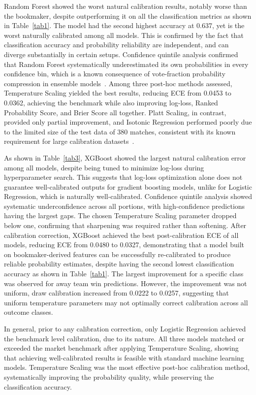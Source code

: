 \documentclass[conference]{IEEEtran}
\begin{document}
Random Forest showed the worst natural calibration results,
notably worse than the bookmaker, despite outperforming it
on all the classification metrics as shown in
Table~\ref{tab1}. The model had the second highest accuracy
at 0.637, yet is the worst naturally calibrated among all
models. This is confirmed by the fact that classification
accuracy and probability reliability are independent, and
can diverge substantially in certain setups. Confidence
quintile analysis confirmed that Random Forest systematically
underestimated its own probabilities in every confidence bin,
which is a known consequence of vote-fraction probability
compression in ensemble models~\cite{b12}. Among three
post-hoc methods assessed, Temperature Scaling yielded the
best results, reducing ECE from 0.0453 to 0.0362, achieving
the benchmark while also improving log-loss, Ranked
Probability Score, and Brier Score all together. Platt
Scaling, in contrast, provided only partial improvement,
and Isotonic Regression performed poorly due to the limited
size of the test data of 380 matches, consistent with its
known requirement for large calibration datasets~\cite{b12}.

As shown in Table~\ref{tab3}, XGBoost showed the largest
natural calibration error among all models, despite being
tuned to minimize log-loss during hyperparameter search.
This suggests that log-loss optimization alone does not
guarantee well-calibrated outputs for gradient boosting
models, unlike for Logistic Regression, which is naturally
well-calibrated. Confidence quintile analysis showed
systematic underconfidence across all portions, with
high-confidence predictions having the largest gaps. The
chosen Temperature Scaling parameter dropped below one,
confirming that sharpening was required rather than
softening. After calibration correction, XGBoost achieved the best
post-calibration ECE of all models, reducing ECE from 0.0480
to 0.0327, demonstrating that a model built on
bookmaker-derived features can be successfully re-calibrated
to produce reliable probability estimates, despite having
the second lowest classification accuracy as shown in
Table~\ref{tab1}. The largest
improvement for a specific class was observed for away
team win predictions. However, the improvement was not
uniform, draw calibration increased from 0.0222 to 0.0257,
suggesting that uniform temperature parameters may not
optimally correct calibration across all outcome classes.

In general, prior to any calibration correction, only
Logistic Regression achieved the benchmark level
calibration, due to its nature. All three models matched
or exceeded the market benchmark after applying Temperature
Scaling, showing that achieving well-calibrated results is
feasible with standard machine learning models. Temperature
Scaling was the most effective post-hoc calibration method,
systematically improving the probability quality, while
preserving the classification accuracy.
\end{document}
